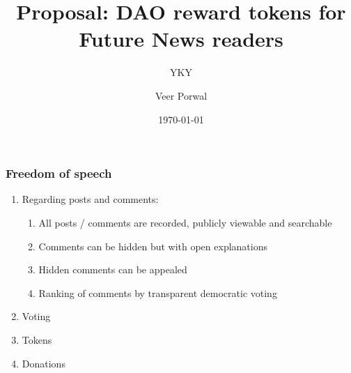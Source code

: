 \documentclass[16pt]{beamer}
\title[Short title]{Proposal: DAO reward tokens for Future News readers}
\author{YKY \and Veer Porwal}
\date{\today} %
\begin{document}
\addtocounter{page}{-1}
\begin{frame}
\titlepage
\end{frame}

\begin{frame}
	\frametitle{Freedom of speech}
	\begin{enumerate}
		\item Regarding posts and comments:
			\begin{enumerate}
			\item All posts / comments are recorded, publicly viewable and searchable
			\item Comments can be hidden but with open explanations
			\item Hidden comments can be appealed
			\item Ranking of comments by transparent democratic voting
			\end{enumerate}
		\item Voting
		\item Tokens
		\item Donations
	\end{enumerate}
\end{frame}
\end{document}
